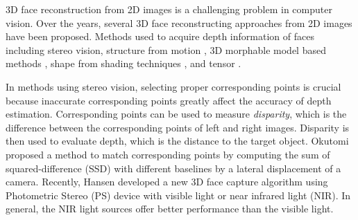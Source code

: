 3D face reconstruction from 2D images is a challenging problem in computer vision.
Over the years, several 3D face reconstructing approaches from 2D images have been proposed. Methods used to acquire depth information of faces including stereo vision\cite{seitz2006comparison}, structure from motion \cite{tomasi1992shape}, 3D morphable model based methods \cite{romdhani2003efficient}, shape from shading techniques \cite{zhang1999shape}, and tensor \cite{vasilescu2002multilinear, kolda2009tensor}.


In methods using stereo vision, selecting proper corresponding points is crucial because inaccurate corresponding points greatly affect the accuracy of depth estimation.  Corresponding points can be used to measure \textit{disparity}, which is the difference between the corresponding points of left and right images. Disparity is then used to evaluate depth, which is the distance to the target object.
Okutomi \cite{okutomi1993multiple} proposed a method to match corresponding points by computing the sum of squared-difference (SSD) with different baselines by a lateral displacement of a camera.
Recently, Hansen \cite{hansen20103d} developed a new 3D face capture algorithm using Photometric Stereo (PS) device with visible light or near infrared light (NIR). In general, the NIR light sources offer better performance than the visible light.

